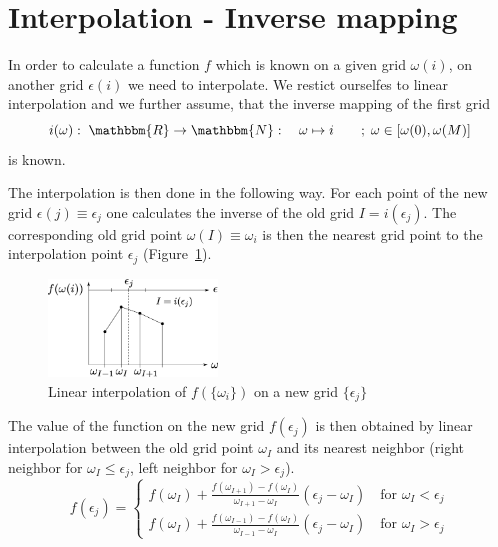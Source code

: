 \section{Interpolation - Inverse mapping}
In order to calculate a function $f$ which is known on a given grid $\omega(i)$, on another grid $\epsilon(i)$ we need to interpolate. We restict ourselfes to linear interpolation and we further assume, that the inverse mapping of the first grid
\[
	i(\omega):\;\mathbbm{R}\to\mathbbm{N}:\quad \omega \mapsto i\quad\quad;\;\omega\in[\omega(0), \omega(M)]
\]
is known.

The interpolation is then done in the following way. For each point of the new grid $\epsilon(j)\equiv \epsilon_j$ one calculates the inverse of the old grid $I=i(\epsilon_j)$. The corresponding old grid point $\omega(I)\equiv \omega_i$ is then the nearest grid point to the interpolation point $\epsilon_j$ (Figure~\ref{fig:interpolation}). 
\begin{figure}[ht]
	\centering
	\includegraphics[width=0.4\textwidth]{pics/interpolation.eps}
	\caption{Linear interpolation of $f(\{\omega_i\})$ on a new grid $\{ \epsilon_j \}$}
	\label{fig:interpolation}
\end{figure}

The value of the function on the new grid $f(\epsilon_j)$ is then obtained by linear interpolation between the old grid point $\omega_I$ and its nearest neighbor (right neighbor for $\omega_I\leq\epsilon_j$, left neighbor for $\omega_I>\epsilon_j$).
\[
	f(\epsilon_j)=\begin{cases}
		f(\omega_I)+\frac{f(\omega_{I+1})-f(\omega_{I})}{\omega_{I+1}-\omega_{I}} (\epsilon_j-\omega_I) \quad \text{for } \omega_I<\epsilon_j \\
		f(\omega_I)+\frac{f(\omega_{I-1})-f(\omega_{I})}{\omega_{I-1}-\omega_{I}} (\epsilon_j-\omega_I) \quad \text{for } \omega_I>\epsilon_j 
	\end{cases}
\]






